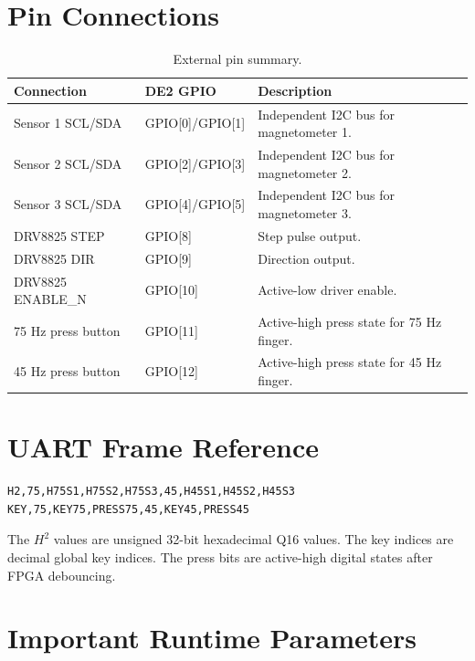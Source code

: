 \section{Pin Connections}
\label{app:pin_connections}

\begin{table}[H]
    \centering
    \caption{External pin summary.}
    \label{tab:appendix_pins}
    \renewcommand{\arraystretch}{1.2}
    \small
    \begin{tabularx}{0.96\textwidth}{p{3.4cm} p{3.5cm} X}
        \toprule
        \textbf{Connection} & \textbf{DE2 GPIO} & \textbf{Description} \\
        \midrule
        Sensor 1 SCL/SDA & GPIO[0]/GPIO[1] & Independent I2C bus for magnetometer 1. \\
        Sensor 2 SCL/SDA & GPIO[2]/GPIO[3] & Independent I2C bus for magnetometer 2. \\
        Sensor 3 SCL/SDA & GPIO[4]/GPIO[5] & Independent I2C bus for magnetometer 3. \\
        DRV8825 STEP & GPIO[8] & Step pulse output. \\
        DRV8825 DIR & GPIO[9] & Direction output. \\
        DRV8825 ENABLE\_N & GPIO[10] & Active-low driver enable. \\
        75 Hz press button & GPIO[11] & Active-high press state for 75 Hz finger. \\
        45 Hz press button & GPIO[12] & Active-high press state for 45 Hz finger. \\
        \bottomrule
    \end{tabularx}
\end{table}

\section{UART Frame Reference}
\label{app:uart_reference}

\begin{lstlisting}
H2,75,H75S1,H75S2,H75S3,45,H45S1,H45S2,H45S3
KEY,75,KEY75,PRESS75,45,KEY45,PRESS45
\end{lstlisting}

The $H^2$ values are unsigned 32-bit hexadecimal Q16 values. The key indices are decimal global key indices. The press bits are active-high digital states after FPGA debouncing.

\section{Important Runtime Parameters}
\label{app:runtime_parameters}

